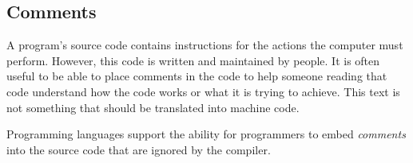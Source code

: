 \clearpage
\subsection{Comments} %
\label{sub:comments}

A program's source code contains instructions for the actions the computer must perform. However, this code is written and maintained by people. It is often useful to be able to place comments in the code to help someone reading that code understand how the code works or what it is trying to achieve. This text is not something that should be translated into machine code.

Programming languages support the ability for programmers to embed \emph{comments} into the source code that are ignored by the compiler.

\bigskip


